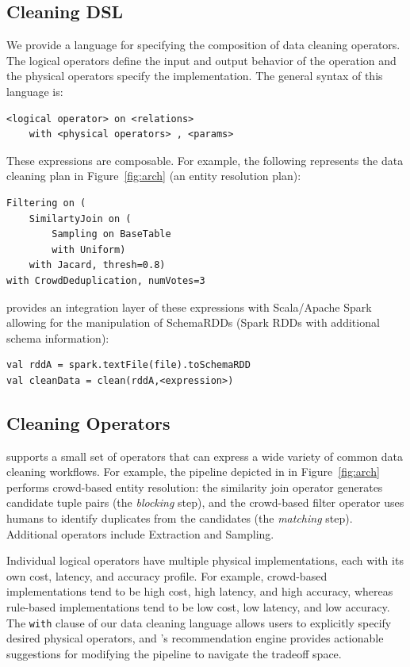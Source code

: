 \subsection{Cleaning DSL}
\label{sec:dsl}
We provide a language for specifying the composition of data cleaning operators.
The logical operators define the input and output behavior of the operation and 
the physical operators specify the implementation.
The general syntax of this language is:
\begin{lstlisting}
<logical operator> on <relations>
	with <physical operators> , <params>
\end{lstlisting}

These expressions are composable. For example, the following represents the data cleaning plan in Figure~\ref{fig:arch} (an entity resolution plan):
\begin{lstlisting} 
Filtering on (
    SimilartyJoin on (
        Sampling on BaseTable
        with Uniform)
    with Jacard, thresh=0.8) 
with CrowdDeduplication, numVotes=3
\end{lstlisting}
\projx provides an integration layer of these expressions with Scala/Apache Spark allowing for the manipulation of SchemaRDDs (Spark RDDs with additional schema information):
\begin{lstlisting}
val rddA = spark.textFile(file).toSchemaRDD
val cleanData = clean(rddA,<expression>)
\end{lstlisting}

\subsection{Cleaning Operators}
\label{sec:operators}
\sys supports a small set of operators that can express a wide variety of common data cleaning workflows. 
For example, the pipeline depicted in in Figure~\ref{fig:arch} performs crowd-based entity resolution: the similarity join operator generates candidate tuple pairs (the \textit{blocking} step), and the crowd-based filter operator uses humans to identify duplicates from the candidates (the \textit{matching} step). 
Additional operators include Extraction and Sampling.

Individual logical operators have multiple physical implementations, each with its own cost, latency, and accuracy profile. 
For example, crowd-based implementations tend to be high cost, high latency, and high accuracy, whereas rule-based implementations tend to be low cost, low latency, and low accuracy. 
The \texttt{with} clause of our data cleaning language allows users to explicitly specify desired physical operators, and \sys's recommendation engine provides actionable suggestions for modifying the pipeline to navigate the tradeoff space.






